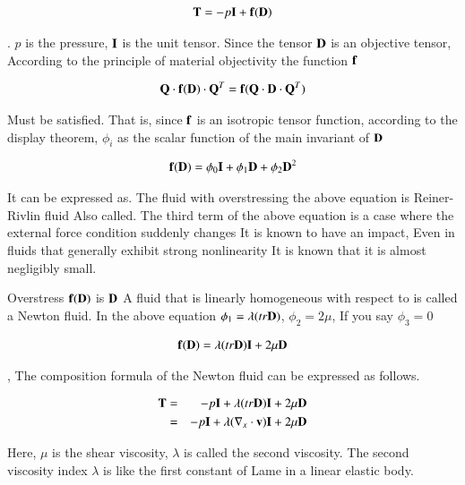 \begin{eqnarray}
{\mathbf{T}} = -p{\mathbf{I}} +{\mathbf{f}}({\mathbf{D}})
\end{eqnarray}

.
$p$ is the pressure, $\mathbf{I}$ is the unit tensor.
Since the tensor $\mathbf{D}$ is an objective tensor,
According to the principle of material objectivity the function $\mathbf{f}$

\begin{eqnarray}
 {\mathbf{Q}} \cdot {\mathbf{f}}({\mathbf{D}}) \cdot {\mathbf{Q}^T} = {\mathbf{f}}( {\mathbf{Q}} \cdot {\mathbf{D}} \cdot {\mathbf{Q}^T} )
\end{eqnarray}

Must be satisfied.
That is, since $\mathbf{f}$ is an isotropic tensor function, according to the display theorem,
$\phi_i$ as the scalar function of the main invariant of $\mathbf{D}$

\begin{eqnarray}
{\mathbf{f}}({\mathbf{D}}) = \phi_0{\mathbf{I}} + \phi_1 {\mathbf{D}} + \phi_2 {\mathbf{D}}^2
\end{eqnarray}

It can be expressed as. The fluid with overstressing the above equation is Reiner-Rivlin fluid
Also called. The third term of the above equation is a case where the external force condition suddenly changes
It is known to have an impact,
Even in fluids that generally exhibit strong nonlinearity
It is known that it is almost negligibly small.

Overstress $\mathbf{f}(\mathbf{D})$ is $\mathbf{D}$
A fluid that is linearly homogeneous with respect to is called a Newton fluid.
In the above equation
$\phi_1=\lambda(tr{\mathbf{D}})$,
$\phi_2=2\mu$,
If you say $\phi_3=0$

\begin{eqnarray}
{\mathbf{f}}({\mathbf{D}})=\lambda(tr{\mathbf{D}}){\mathbf{I}} + 2\mu{\mathbf{D}}
\end{eqnarray}

, The composition formula of the Newton fluid can be expressed as follows.

\begin{eqnarray}
{\mathbf{T}}
&=&  -p {\mathbf{I}} + \lambda(tr{\mathbf{D}}){\mathbf{I}} + 2\mu{\mathbf{D}}\\
&=& -p {\mathbf{I}} + \lambda(\nabla_x \cdot {\mathbf{v}}){\mathbf{I}} + 2\mu{\mathbf{D}}
\end{eqnarray}

Here, $\mu$ is the shear viscosity,
$\lambda$ is called the second viscosity.
The second viscosity index $\lambda$ is like the first constant of Lame in a linear elastic body.

